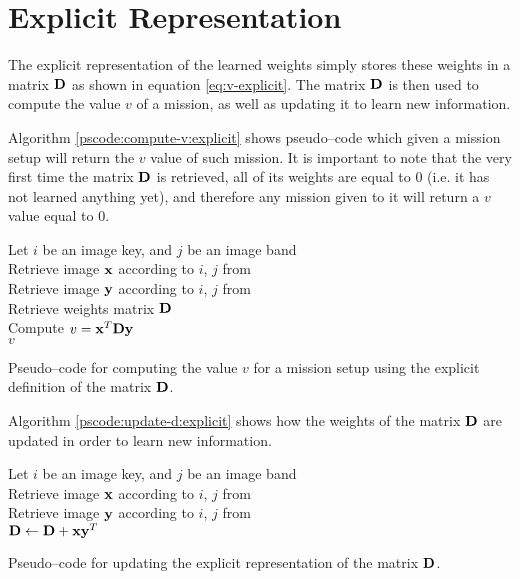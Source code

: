 \section{Explicit Representation} \label{sect:meth:explicit}

The explicit representation of the learned weights simply stores these weights in a matrix $\boldsymbol{\mathbf{D}}$ as shown in equation \ref{eq:v-explicit}. The matrix $\boldsymbol{\mathbf{D}}$ is then used to compute the value $v$ of a mission, as well as updating it to learn new information.

Algorithm \ref{pscode:compute-v:explicit} shows pseudo--code which given a mission setup will return the $v$ value of such mission. It is important to note that the very first time the matrix $\boldsymbol{\mathbf{D}}$ is retrieved, all of its weights are equal to $0$ (i.e. it has not learned anything yet), and therefore any mission given to it will return a $v$ value equal to $0$.

\vspace{0.4cm}
\begin{algorithm}[H]
    \SetAlgoLined
         {
            Let $i$ be an image key, and $j$ be an image band \\
            Retrieve image $\boldsymbol{\mathbf{x}}$ according to $i$, $j$ from \usno \\
            Retrieve image $\boldsymbol{\mathbf{y}}$ according to $i$, $j$ from \panstarrs \\
            Retrieve weights matrix $\boldsymbol{\mathbf{D}}$ \\
            Compute $v = \boldsymbol{\mathbf{x}}^T \boldsymbol{\mathbf{D}} \boldsymbol{\mathbf{y}}$ \\
            \Return $v$
        }
    \caption{Pseudo--code for computing the value $v$ for a mission setup using the explicit definition of the matrix $\boldsymbol{\mathbf{D}}$.}
    \label{pscode:compute-v:explicit}
\end{algorithm}
\vspace{0.4cm}

Algorithm \ref{pscode:update-d:explicit} shows how the weights of the matrix $\boldsymbol{\mathbf{D}}$ are updated in order to learn new information.

\vspace{0.4cm}
\begin{algorithm}[H]
    \SetAlgoLined
         {
            Let $i$ be an image key, and $j$ be an image band \\
            Retrieve image $\boldsymbol{\mathbf{x}}$ according to $i$, $j$ from \usno \\
            Retrieve image $\boldsymbol{\mathbf{y}}$ according to $i$, $j$ from \panstarrs \\
            $\boldsymbol{\mathbf{D}} \gets \boldsymbol{\mathbf{D}} + \boldsymbol{\mathbf{x}}\boldsymbol{\mathbf{y}}^T$ \\
        }
    \caption{Pseudo--code for updating the explicit representation of the matrix $\boldsymbol{\mathbf{D}}$.}
    \label{pscode:update-d:explicit}
\end{algorithm}
\vspace{0.4cm}

